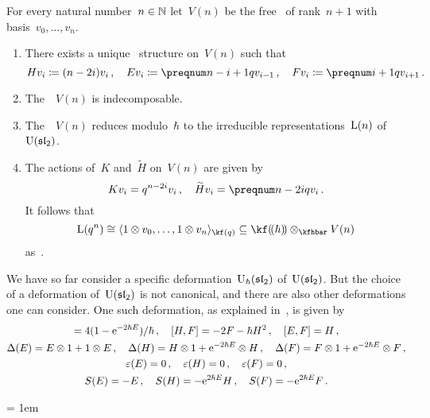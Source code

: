 \documentclass[a4paper, 11pt, oneside]{scrartcl}
\begin{document}
\begin{theorem}
  For every natural number~$n \in \mathbb{N}$ let~$V(n)$ be the free~\module{$\kfhbar$} of rank~$n+1$ with basis~$v_0, \dotsc, v_n$.
  \begin{enumerate}
    \item
      There exists a unique~ structure on~$V(n)$ such that
      \[
        H v_i \defined (n - 2i) v_i \,,
        \quad
        E v_i \defined \qnum{n - i + 1} v_{i-1} \,,
        \quad
        F v_i \defined \qnum{i+1} v_{i+1} \,.
      \]
    \item
      The~~$V(n)$ is indecomposable.
    \item
      The~~$V(n)$ reduces modulo~$\hbar$ to the irreducible representations~$\operatorname{L}(n)$ of~$\operatorname{U}(\mathfrak{sl}_2)$.
    \item
      The actions of~$K$ and~$\widetilde{H}$ on~$V(n)$ are given by
      \[
        K v_i
        =
        q^{n - 2i} v_i \,,
        \quad
        \widetilde{H} v_i
        =
        \qnum{n - 2i} v_i \,.
      \]
      It follows that
      \[
        \irred(q^n)
        \cong
        \gen{1 \tensor v_0, \dotsc, 1 \tensor v_n}_{\kf(q)}
        \subseteq
        \lpower{\kf}{\hbar} \tensor_{\kfhbar} V(n)
      \]
      as~.
  \end{enumerate}
\end{theorem}


\begin{remark}
  We have so far consider a specific deformation~$\operatorname{U}_{\hbar}(\mathfrak{sl}_2)$ of~$\operatorname{U}(\mathfrak{sl}_2)$.
  But the choice of a deformation of~$\operatorname{U}(\mathfrak{sl}_2)$ is not canonical, and there are also other deformations one can consider.
  One such deformation, as explained in~\cite[\S 6.4,~F]{guide_to_quantum_groups}, is given by
  \begin{gather*}
    [H, E] = 4 ( 1 - \e^{-2 \hbar E} ) / \hbar \,,
    \quad
    [H, F] = -2 F - \hbar H^2 \,,
    \quad
    [E, F] = H \,,
    \\
    \Delta(E) = E \tensor 1 + 1 \tensor E \,,
    \quad
    \Delta(H) = H \tensor 1 + \e^{-2 \hbar E} \tensor H \,,
    \quad
    \Delta(F) = F \tensor 1 + \e^{-2 \hbar E} \tensor F \,,
    \\
    \varepsilon(E) = 0 \,,
    \quad
    \varepsilon(H) = 0 \,,
    \quad
    \varepsilon(F) = 0 \,,
    \\
    S(E) = -E \,,
    \quad
    S(H) = - \e^{2 \hbar E} H \,,
    \quad
    S(F) = - \e^{2 \hbar E} F \,.
  \end{gather*}
\end{remark}




\emergencystretch = 1em
\printbibliography
\end{document}
